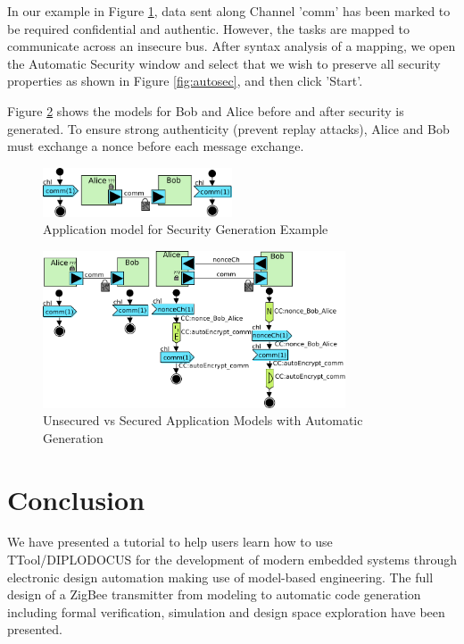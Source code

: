 \documentclass{llncs}
\begin{document}
In our example in Figure \ref{fig:autogenexample}, data sent along Channel 'comm' has been marked to be required confidential and authentic. However, the tasks are mapped to communicate across an insecure bus. After syntax analysis of a mapping, we open the Automatic Security window and select that we wish to preserve all security properties as shown in Figure \ref{fig:autosec}, and  then click 'Start'.

Figure \ref{fig:autogenres} shows the models for Bob and Alice before and after security is generated. To ensure strong authenticity (prevent replay attacks), Alice and Bob must exchange a nonce before each message exchange.


\begin{figure}[htbp]
	\centering
 	\includegraphics[width=0.5\textwidth]{figures/securityStuff/secComp.pdf}
	\caption{Application model for Security Generation Example}
	\label{fig:autogenexample}
\end{figure}


\begin{figure}[htbp]
	\centering
 	\includegraphics[width=0.8\textwidth]{figures/securityStuff/secCompRes.pdf}
	\caption{Unsecured vs Secured Application Models with Automatic Generation}
	\label{fig:autogenres}
\end{figure}
%
%
%
\newpage
\section{Conclusion}
\label{sec:Conclusion}
We have presented a tutorial to help users learn how to use TTool/DIPLODOCUS for
the development of modern embedded systems through electronic design automation
making use of model-based engineering. The full design of a ZigBee transmitter from modeling to automatic code generation
including formal verification, simulation and design space exploration have been
presented.
\end{document}
